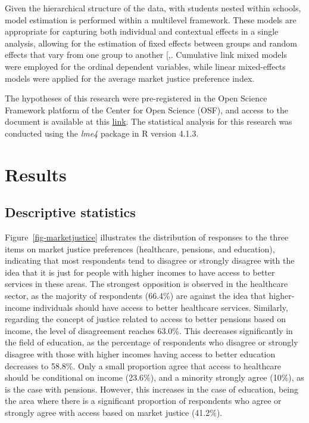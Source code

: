 \documentclass[
  12pt,
  letterpaper,
]{article}
\begin{document}
Given the hierarchical structure of the data, with students nested
within schools, model estimation is performed within a multilevel
framework. These models are appropriate for capturing both individual
and contextual effects in a single analysis, allowing for the estimation
of fixed effects between groups and random effects that vary from one
group to another
{[},\citeproc{ref-hox_multilevel_2010}{75}{]}.
Cumulative link mixed models were employed for the ordinal dependent
variables, while linear mixed-effects models were applied for the
average market justice preference index.

The hypotheses of this research were pre-registered in the Open Science
Framework platform of the Center for Open Science (OSF), and access to
the document is available at this
\href{https://doi.org/10.17605/OSF.IO/UFSDV}{link}. The statistical
analysis for this research was conducted using the \emph{lme4} package
in R version 4.1.3.

\section{Results}\label{results}

\subsection{Descriptive statistics}\label{descriptive-statistics}

Figure~\ref{fig-marketjustice} illustrates the distribution of responses
to the three items on market justice preferences (healthcare, pensions,
and education), indicating that most respondents tend to disagree or
strongly disagree with the idea that it is just for people with higher
incomes to have access to better services in these areas. The strongest
opposition is observed in the healthcare sector, as the majority of
respondents (66.4\%) are against the idea that higher-income individuals
should have access to better healthcare services. Similarly, regarding
the concept of justice related to access to better pensions based on
income, the level of disagreement reaches 63.0\%. This decreases
significantly in the field of education, as the percentage of
respondents who disagree or strongly disagree with those with higher
incomes having access to better education decreases to 58.8\%. Only a
small proportion agree that access to healthcare should be conditional
on income (23.6\%), and a minority strongly agree (10\%), as is the case
with pensions. However, this increases in the case of education, being
the area where there is a significant proportion of respondents who
agree or strongly agree with access based on market justice (41.2\%).
\end{document}

